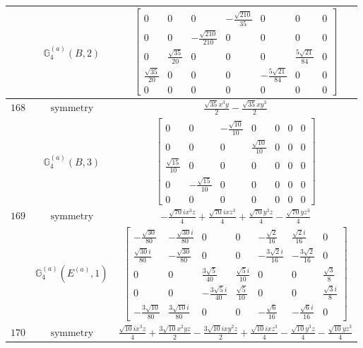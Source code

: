 \documentclass[fleqn,8pt,landscape]{jsarticle}
\begin{document}
\begin{longtable}{ccc}
$  $ & $ \mathbb{G}_{4}^{(a)}(B,2) $ & $ \begin{bmatrix} 0 & 0 & 0 & - \frac{\sqrt{210}}{35} & 0 & 0 & 0 \\ 0 & 0 & - \frac{\sqrt{210}}{210} & 0 & 0 & 0 & 0 \\ 0 & \frac{\sqrt{35}}{20} & 0 & 0 & 0 & \frac{5 \sqrt{21}}{84} & 0 \\ \frac{\sqrt{35}}{20} & 0 & 0 & 0 & - \frac{5 \sqrt{21}}{84} & 0 & 0 \\ 0 & 0 & 0 & 0 & 0 & 0 & 0 \end{bmatrix} $ \\ \hline
$ 168 $ & $ \text{symmetry} $ & $ \frac{\sqrt{35} x^{3} y}{2} - \frac{\sqrt{35} x y^{3}}{2} $ \\
$  $ & $ \mathbb{G}_{4}^{(a)}(B,3) $ & $ \begin{bmatrix} 0 & 0 & - \frac{\sqrt{10}}{10} & 0 & 0 & 0 & 0 \\ 0 & 0 & 0 & \frac{\sqrt{10}}{10} & 0 & 0 & 0 \\ \frac{\sqrt{15}}{10} & 0 & 0 & 0 & 0 & 0 & 0 \\ 0 & - \frac{\sqrt{15}}{10} & 0 & 0 & 0 & 0 & 0 \\ 0 & 0 & 0 & 0 & 0 & 0 & 0 \end{bmatrix} $ \\ \hline
$ 169 $ & $ \text{symmetry} $ & $ - \frac{\sqrt{70} i x^{3} z}{4} + \frac{\sqrt{70} i x z^{3}}{4} + \frac{\sqrt{70} y^{3} z}{4} - \frac{\sqrt{70} y z^{3}}{4} $ \\
$  $ & $ \mathbb{G}_{4}^{(a)}(E^{(a)},1) $ & $ \begin{bmatrix} - \frac{\sqrt{30}}{80} & - \frac{\sqrt{30} i}{80} & 0 & 0 & - \frac{\sqrt{2}}{16} & \frac{\sqrt{2} i}{16} & 0 \\ \frac{\sqrt{30} i}{80} & - \frac{\sqrt{30}}{80} & 0 & 0 & - \frac{3 \sqrt{2} i}{16} & - \frac{3 \sqrt{2}}{16} & 0 \\ 0 & 0 & \frac{3 \sqrt{5}}{40} & \frac{\sqrt{5} i}{10} & 0 & 0 & \frac{\sqrt{3}}{8} \\ 0 & 0 & - \frac{3 \sqrt{5} i}{40} & \frac{\sqrt{5}}{10} & 0 & 0 & \frac{\sqrt{3} i}{8} \\ - \frac{3 \sqrt{10}}{80} & \frac{3 \sqrt{10} i}{80} & 0 & 0 & - \frac{\sqrt{6}}{16} & - \frac{\sqrt{6} i}{16} & 0 \end{bmatrix} $ \\ \hline
$ 170 $ & $ \text{symmetry} $ & $ \frac{\sqrt{10} i x^{3} z}{4} + \frac{3 \sqrt{10} x^{2} y z}{2} - \frac{3 \sqrt{10} i x y^{2} z}{2} + \frac{\sqrt{10} i x z^{3}}{4} - \frac{\sqrt{10} y^{3} z}{4} - \frac{\sqrt{10} y z^{3}}{4} $ \\

\end{longtable}
\end{document}
